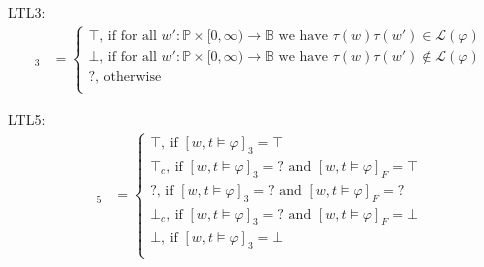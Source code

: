 \documentclass[envcountsame, runningheads]{llncs}
\newcommand{\B}{\mathbb{B}}
\newcommand{\?}{\text{?}}
\begin{document}
	LTL3:
	\begin{align*}
		[w,t \models \varphi]_3 &= \begin{cases}
			\top \text{, if for all }  w' : \mathbb{P} \times [0, \infty) \to \B  \text{ we have } \tau(w) \tau(w') \in \mathcal{L}(\varphi)\\
			\bot \text{, if for all }  w' : \mathbb{P} \times [0, \infty) \to \B  \text{ we have } \tau(w) \tau(w') \notin \mathcal{L}(\varphi)\\
			? \text{, otherwise}\\
		\end{cases}
	\end{align*}
	
	LTL5:
	\begin{align*}
		[w,t \models \varphi]_{5} &= \begin{cases}
			\top \text{, if } [w,t \models \varphi]_3 = \top \\
			\top_c \text{, if } [w,t \models \varphi]_3 = ? \text{ and } [w,t \models \varphi]_F = \top \\
			? \text{, if } [w,t \models \varphi]_3 = ? \text{ and } [w,t \models \varphi]_F = ? \\
			\bot_c \text{, if } [w,t \models \varphi]_3 = ? \text{ and } [w,t \models \varphi]_F = \bot \\
			\bot \text{, if } [w,t \models \varphi]_3 = \bot \\
		\end{cases} \\
	\end{align*}	
	
	\newpage
	
	
\end{document}
